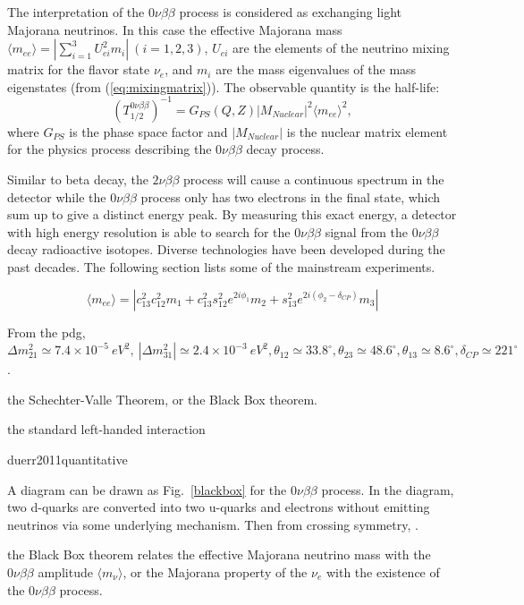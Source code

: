 The interpretation of the $0\nu\beta\beta$ process is considered as exchanging light Majorana neutrinos. In this case the effective Majorana mass $\langle m_{ee}\rangle=|\sum_{i=1}^{3} U_{ei}^2m_i|~(i=1,2,3)$, $U_{ei}$ are the elements of the neutrino mixing matrix for the flavor state $\nu_e$, and $m_i$ are the mass eigenvalues of the mass eigenstates (from (\ref{eq:mixingmatrix})). The observable quantity is the half-life:
\begin{equation}
(T^{0\nu\beta\beta}_{1/2})^{-1} = G_{PS}(Q,Z)|M_{Nuclear}|^2\langle m_{ee}\rangle^2, 
\end{equation}
where $G_{PS}$ is the phase space factor and $|M_{Nuclear}|$ is the nuclear matrix element for the physics process describing the $0\nu\beta\beta$ decay process\cite{zuber2011neutrino}.

Similar to beta decay, the $2\nu\beta\beta$ process will cause a continuous spectrum in the detector while the $0\nu\beta\beta$ process only has two electrons in the final state, which sum up to give a distinct energy peak. By measuring this exact energy, a detector with high energy resolution is able to search for the $0\nu\beta\beta$ signal from the $0\nu\beta\beta$ decay radioactive isotopes. Diverse technologies have been developed during the past decades. The following section lists some of the mainstream experiments.

\begin{equation}
\langle m_{ee} \rangle = |c^2_{13}c^2_{12}m_1+c^2_{13}s^2_{12}e^{2i\phi_1}m_2+s^2_{13}e^{2i(\phi_2-\delta_{CP})}m_3|
\end{equation}

From the pdg, $\Delta m^2_{21}\simeq 7.4\times 10^{-5}~eV^2,~|\Delta m^2_{31}|\simeq 2.4\times 10^{-3}~eV^2 ,\theta_{12}\simeq 33.8^\circ, \theta_{23}\simeq 48.6^\circ,\theta_{13}\simeq 8.6^\circ, \delta_{CP}\simeq 221^\circ$.

the Schechter-Valle Theorem, or the Black Box theorem.

the standard left-handed interaction


duerr2011quantitative  


A diagram can be drawn as Fig.~\ref{blackbox} for the $0\nu\beta\beta$ process.
In the diagram, two d-quarks are converted into two u-quarks and electrons without emitting neutrinos via some underlying mechanism. Then from crossing symmetry, \cite{akhmedov2014majorana}.

the Black Box theorem relates the effective Majorana neutrino mass with the $0\nu\beta\beta$ amplitude $\langle m_\nu\rangle$, or the Majorana property of the $\nu_e$ with the existence of the $0\nu\beta\beta$ process. 




